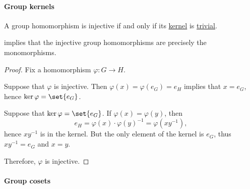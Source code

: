 \paragraph{Group kernels}

\begin{proposition}\label{thm:group_homomorphism_zero_kernel}
  A group homomorphism is injective if and only if its \hyperref[def:group/kernel]{kernel} is \hyperref[def:group/trivial]{trivial}.
\end{proposition}
\begin{comments}
  \item {} implies that the injective group homomorphisms are precisely the monomorphisms.
\end{comments}
\begin{proof}
  Fix a homomorphism \( \varphi: G \to H \).

  \SufficiencySubProof Suppose that \( \varphi \) is injective. Then \( \varphi(x) = \varphi(e_G) = e_H \) implies that \( x = e_G \), hence \( \ker \varphi = \set{ e_G } \).

  \NecessitySubProof Suppose that \( \ker \varphi = \set{ e_G } \). If \( \varphi(x) = \varphi(y) \), then
  \begin{equation*}
    e_H = \varphi(x) \cdot \varphi(y)^{-1} = \varphi(xy^{-1}),
  \end{equation*}
  hence \( x y^{-1} \) is in the kernel. But the only element of the kernel is \( e_G \), thus \( x y^{-1} = e_G \) and \( x = y \).

  Therefore, \( \varphi \) is injective.
\end{proof}

\paragraph{Group cosets}

